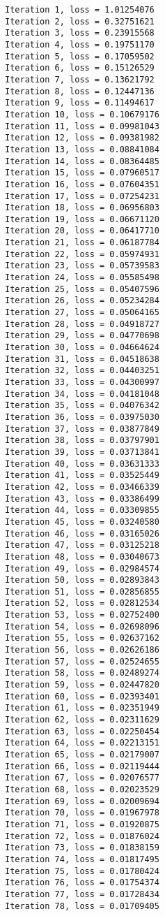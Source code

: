 \documentclass[11pt]{article}
\begin{document}
    \begin{Verbatim}[commandchars=\\\{\}]
Iteration 1, loss = 1.01254076
Iteration 2, loss = 0.32751621
Iteration 3, loss = 0.23915568
Iteration 4, loss = 0.19751170
Iteration 5, loss = 0.17059502
Iteration 6, loss = 0.15126529
Iteration 7, loss = 0.13621792
Iteration 8, loss = 0.12447136
Iteration 9, loss = 0.11494617
Iteration 10, loss = 0.10679176
Iteration 11, loss = 0.09981043
Iteration 12, loss = 0.09381982
Iteration 13, loss = 0.08841084
Iteration 14, loss = 0.08364485
Iteration 15, loss = 0.07960517
Iteration 16, loss = 0.07604351
Iteration 17, loss = 0.07254231
Iteration 18, loss = 0.06956803
Iteration 19, loss = 0.06671120
Iteration 20, loss = 0.06417710
Iteration 21, loss = 0.06187784
Iteration 22, loss = 0.05974931
Iteration 23, loss = 0.05739583
Iteration 24, loss = 0.05585498
Iteration 25, loss = 0.05407596
Iteration 26, loss = 0.05234284
Iteration 27, loss = 0.05064165
Iteration 28, loss = 0.04918727
Iteration 29, loss = 0.04770698
Iteration 30, loss = 0.04664624
Iteration 31, loss = 0.04518638
Iteration 32, loss = 0.04403251
Iteration 33, loss = 0.04300997
Iteration 34, loss = 0.04181048
Iteration 35, loss = 0.04076342
Iteration 36, loss = 0.03975030
Iteration 37, loss = 0.03877849
Iteration 38, loss = 0.03797901
Iteration 39, loss = 0.03713841
Iteration 40, loss = 0.03631333
Iteration 41, loss = 0.03525449
Iteration 42, loss = 0.03466339
Iteration 43, loss = 0.03386499
Iteration 44, loss = 0.03309855
Iteration 45, loss = 0.03240580
Iteration 46, loss = 0.03165026
Iteration 47, loss = 0.03125218
Iteration 48, loss = 0.03040673
Iteration 49, loss = 0.02984574
Iteration 50, loss = 0.02893843
Iteration 51, loss = 0.02856855
Iteration 52, loss = 0.02812534
Iteration 53, loss = 0.02752400
Iteration 54, loss = 0.02698096
Iteration 55, loss = 0.02637162
Iteration 56, loss = 0.02626186
Iteration 57, loss = 0.02524655
Iteration 58, loss = 0.02489274
Iteration 59, loss = 0.02447820
Iteration 60, loss = 0.02393401
Iteration 61, loss = 0.02351949
Iteration 62, loss = 0.02311629
Iteration 63, loss = 0.02250454
Iteration 64, loss = 0.02213151
Iteration 65, loss = 0.02179007
Iteration 66, loss = 0.02119444
Iteration 67, loss = 0.02076577
Iteration 68, loss = 0.02023529
Iteration 69, loss = 0.02009694
Iteration 70, loss = 0.01967978
Iteration 71, loss = 0.01920875
Iteration 72, loss = 0.01876024
Iteration 73, loss = 0.01838159
Iteration 74, loss = 0.01817495
Iteration 75, loss = 0.01780424
Iteration 76, loss = 0.01754374
Iteration 77, loss = 0.01728434
Iteration 78, loss = 0.01709405

\end{Verbatim}
\end{document}
